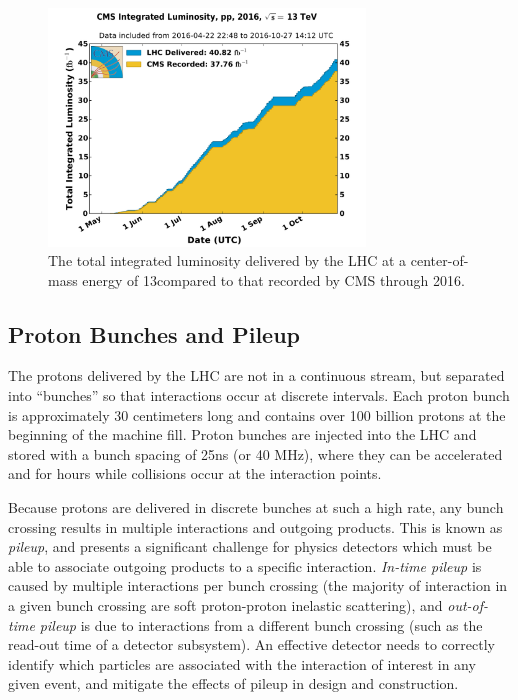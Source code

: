 \begin{figure}
	\centering
	\includegraphics[width=0.75\textwidth]{detector/figs/int_lumi_per_day_cumulative_pp_2016}
	\caption{The total integrated luminosity delivered by the LHC at a center-of-mass energy of 13\TeV compared to that recorded by CMS through 2016.}
	\label{fig:lumi}
\end{figure}

\subsection{Proton Bunches and Pileup}
\label{subsec:pileup}

The protons delivered by the LHC are not in a continuous stream, but separated into ``bunches'' so that interactions occur at discrete intervals. Each proton bunch is approximately 30 centimeters long and contains over 100 billion protons at the beginning of the machine fill. Proton bunches are injected into the LHC and stored with a bunch spacing of 25ns (or 40 MHz), where they can be accelerated and for hours while collisions occur at the interaction points.

Because protons are delivered in discrete bunches at such a high rate, any bunch crossing results in multiple interactions and outgoing products. This is known as {\it pileup}, and presents a significant challenge for physics detectors which must be able to associate outgoing products to a specific interaction. {\it In-time pileup} is caused by multiple interactions per bunch crossing (the majority of interaction in a given bunch crossing are soft proton-proton inelastic scattering), and {\it out-of-time pileup} is due to interactions from a different bunch crossing (such as the read-out time of a detector subsystem). An effective detector needs to correctly identify which particles are associated with the interaction of interest in any given event, and mitigate the effects of pileup in design and construction.

